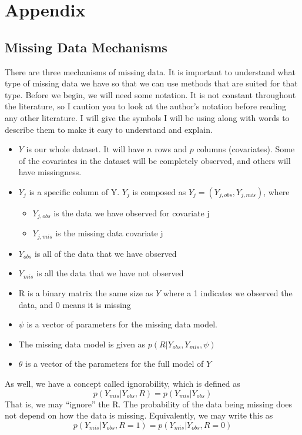 \chapter{Appendix}
\section{Missing Data Mechanisms}
\label{app:apdx}
There are three mechanisms of missing data. It is important to understand what type of missing data we have so that we can use methods that are suited for that type. 
Before we begin, we will need some notation. It is not constant throughout the literature, so I caution you to look at the author's notation before reading any other literature. I will give the symbols I will be using along with words to describe them to make it easy to understand and explain.
\begin{itemize}
\item $Y$ is our whole dataset. It will have $n$ rows and $p$ columns (covariates). Some of the covariates in the dataset will be completely observed, and others will have missingness.
\item $Y_j$ is a specific column of Y. $Y_j$ is composed as $Y_j=(Y_{j,obs},Y_{j,mis})$, where
	\begin{itemize}
	\item $Y_{j,obs}$ is the data we have observed for covariate j
	\item $Y_{j,mis}$ is the missing data covariate j
\end{itemize} 
\item $Y_{obs}$ is all of the data that we have observed
\item $Y_{mis}$ is all the data that we have not observed
\item R is a binary matrix the same size as $Y$ where a 1 indicates we observed the data, and 0 means it is missing
\item $\psi$ is a vector of parameters for the missing data model. 
\item The missing data model is given as $p(R|Y_{obs},Y_{mis},\psi)$
\item $\theta$ is a vector of the parameters for the full model of $Y$
\end{itemize}
As well, we have a concept called ignorability, which is defined as
$$p(Y_{mis}|Y_{obs},R)= p(Y_{mis}|Y_{obs})$$
That is, we may ``ignore'' the R. The probability of the data being missing does not depend on how the data is missing. Equivalently, we may write this as
$$p(Y_{mis}|Y_{obs},R=1)= p(Y_{mis}|Y_{obs},R=0)$$
